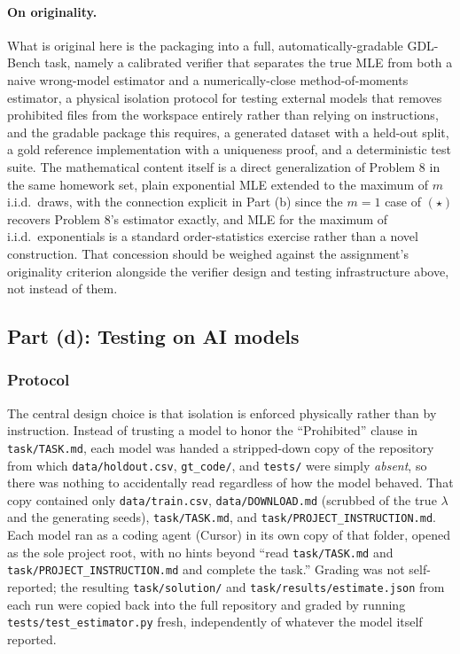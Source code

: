 \documentclass[11pt]{article}
\begin{document}
\paragraph{On originality.} What is original here is the packaging into a full,
automatically-gradable GDL-Bench task, namely a calibrated verifier that
separates the true MLE from both a naive wrong-model estimator and a
numerically-close method-of-moments estimator, a physical isolation protocol
for testing external models that removes prohibited files from the workspace
entirely rather than relying on instructions, and the gradable package this
requires, a generated dataset with a held-out split, a gold reference
implementation with a uniqueness proof, and a deterministic test suite. The
mathematical content itself is a direct generalization of Problem 8 in the same
homework set, plain exponential MLE extended to the maximum of $m$ i.i.d.\
draws, with the connection explicit in Part (b) since the $m = 1$ case of
$(\star)$ recovers Problem 8's estimator exactly, and MLE for the maximum of
i.i.d.\ exponentials is a standard order-statistics exercise rather than a novel
construction. That concession should be weighed against the assignment's
originality criterion alongside the verifier design and testing infrastructure
above, not instead of them.

\subsection*{Part (d): Testing on AI models}

\subsubsection*{Protocol}

The central design choice is that isolation is enforced physically rather than
by instruction. Instead of trusting a model to honor the ``Prohibited'' clause
in \texttt{task/TASK.md}, each model was handed a stripped-down copy of the
repository from which \texttt{data/holdout.csv}, \texttt{gt\_code/}, and
\texttt{tests/} were simply \emph{absent}, so there was nothing to accidentally
read regardless of how the model behaved. That copy contained only
\texttt{data/train.csv}, \texttt{data/DOWNLOAD.md} (scrubbed of the true
$\lambda$ and the generating seeds), \texttt{task/TASK.md}, and
\texttt{task/PROJECT\_INSTRUCTION.md}. Each model ran as a coding agent (Cursor)
in its own copy of that folder, opened as the sole project root, with no hints
beyond ``read \texttt{task/TASK.md} and \texttt{task/PROJECT\_INSTRUCTION.md}
and complete the task.'' Grading was not self-reported; the resulting
\texttt{task/solution/} and \texttt{task/results/estimate.json} from each run
were copied back into the full repository and graded by running
\texttt{tests/test\_estimator.py} fresh, independently of whatever the model
itself reported.
\end{document}

